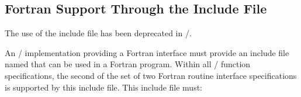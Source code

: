 \subsection{Fortran Support Through the \texorpdfstring{}{mpif.h} Include File}
\label{f90:basic}

The use of the  include file has been deprecated in \MPIIVDOTI/.

An \MPI/ implementation providing a Fortran interface must provide an include file named  that
can be used in a Fortran program.
Within all \MPI/ function specifications,
the second of the set of two Fortran routine interface specifications is supported by this include file.
This include file must:

